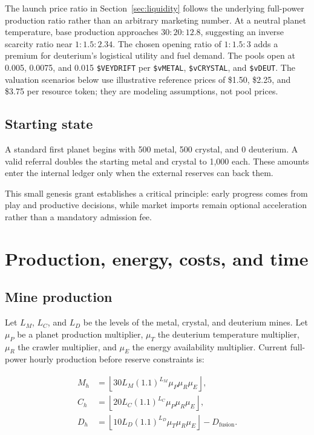 \documentclass[11pt]{article}
\newcommand{\token}[1]{\texttt{\$#1}}
\begin{document}
The launch price ratio in Section~\ref{sec:liquidity} follows the underlying full-power production ratio rather than an arbitrary marketing number. At a neutral planet temperature, base production approaches $30:20:12.8$, suggesting an inverse scarcity ratio near $1:1.5:2.34$. The chosen opening ratio of $1:1.5:3$ adds a premium for deuterium's logistical utility and fuel demand. The pools open at 0.005, 0.0075, and 0.015 \token{VEYDRIFT} per \token{vMETAL}, \token{vCRYSTAL}, and \token{vDEUT}. The valuation scenarios below use illustrative reference prices of \$1.50, \$2.25, and \$3.75 per resource token; they are modeling assumptions, not pool prices.

\subsection{Starting state}

A standard first planet begins with 500 metal, 500 crystal, and 0 deuterium. A valid referral doubles the starting metal and crystal to 1,000 each. These amounts enter the internal ledger only when the external reserves can back them.

This small genesis grant establishes a critical principle: early progress comes from play and productive decisions, while market imports remain optional acceleration rather than a mandatory admission fee.

\section{Production, energy, costs, and time}

\subsection{Mine production}

Let $L_M$, $L_C$, and $L_D$ be the levels of the metal, crystal, and deuterium mines. Let $\mu_P$ be a planet production multiplier, $\mu_T$ the deuterium temperature multiplier, $\mu_R$ the crawler multiplier, and $\mu_E$ the energy availability multiplier. Current full-power hourly production before reserve constraints is:

\begin{align}
M_h &= \left\lfloor 30 L_M (1.1)^{L_M} \mu_P \mu_R \mu_E \right\rfloor,\\
C_h &= \left\lfloor 20 L_C (1.1)^{L_C} \mu_P \mu_R \mu_E \right\rfloor,\\
D_h &= \left\lfloor 10 L_D (1.1)^{L_D} \mu_T \mu_R \mu_E \right\rfloor - D_{\mathrm{fusion}}.
\end{align}
\end{document}

